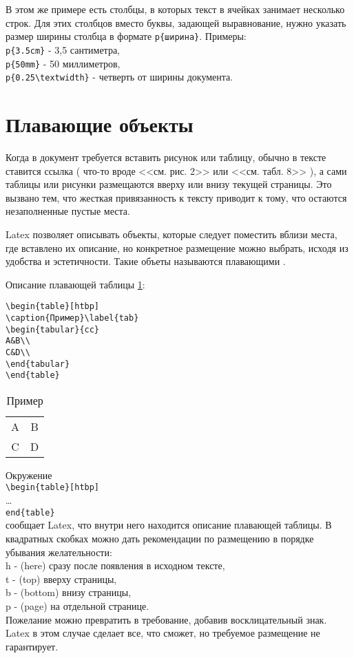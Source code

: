 В этом же примере есть столбцы, в которых текст в ячейках занимает несколько строк. Для этих столбцов вместо буквы, задающей выравнование, нужно указать размер ширины столбца в формате \verb|p{ширина}|. Примеры:\\
\verb|p{3.5cm}| - 3,5 сантиметра,\\
\verb|p{50mm}| - 50 миллиметров,\\
\verb|p{0.25\textwidth}| - четверть от ширины документа.

\section{Плавающие объекты}\label{plav}

Когда в документ требуется вставить рисунок или таблицу, обычно в тексте ставится ссылка ( что-то вроде <<см. рис. 2>> или <<см. табл. 8>> ), а сами таблицы или рисунки размещаются вверху или внизу текущей страницы. Это вызвано тем, что жесткая привязанность к тексту приводит к тому, что остаются незаполненные пустые места.

Latex позволяет описывать объекты, которые следует поместить вблизи места, где вставлено их описание, но конкретное размещение можно выбрать, исходя из удобства и эстетичности. Такие объеты называются плавающими \cite[][с.~43]{__2010}. 

Описание плавающей таблицы \ref{tab}:

\begin{verbatim}
\begin{table}[htbp]
\caption{Пример}\label{tab}
\begin{tabular}{cc}
A&B\\
C&D\\
\end{tabular}
\end{table}
\end{verbatim}

\begin{table}[htbp]
\caption{Пример}\label{tab}
\begin{tabular}{cc}
A&B\\
C&D\\
\end{tabular}
\end{table}

Окружение\\
\verb|\begin{table}[htbp]|\\
\ldots\\
\verb|end{table}|\\
сообщает Latex, что  внутри него находится описание плавающей таблицы. В квадратных скобках можно дать рекомендации по размещению в порядке убывания желательности:\\
h - (here) сразу после появления в исходном тексте,\\
t - (top) вверху страницы,\\
b - (bottom) внизу страницы,\\
p - (page) на отдельной странице.\\ 
Пожелание можно превратить в требование, добавив восклицательный знак. Latex в этом случае сделает все, что сможет, но требуемое размещение не гарантирует.

